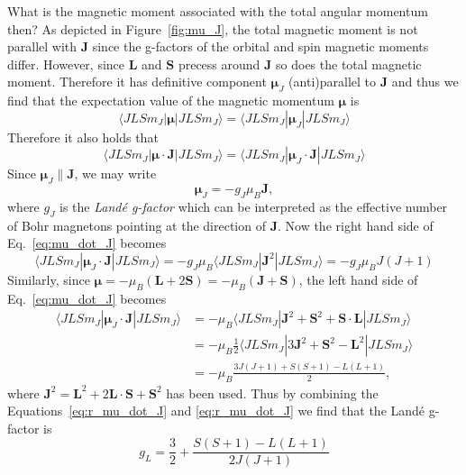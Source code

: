 What is the magnetic moment associated with the total angular momentum then?
As depicted in Figure~\ref{fig:mu_J}, the total magnetic moment is not parallel with $\mathbf{J}$ since the g-factors of the orbital and spin magnetic moments differ. However, since $\mathbf{L}$ and $\mathbf{S}$ precess around $\mathbf{J}$ so does the total magnetic moment. Therefore it has definitive component $\boldsymbol{\mu}_J$ (anti)parallel to $\mathbf{J}$ and thus we find that the expectation value of the magnetic momentum $\boldsymbol{\mu}$ is 
\begin{equation}
\langle JLSm_J|\boldsymbol{\mu}|JLSm_J\rangle
= \langle JLSm_J|\boldsymbol{\mu}_J|JLSm_J\rangle
\end{equation}
Therefore it also holds that 
\begin{equation}\label{eq:mu_dot_J}
\langle JLSm_J|\boldsymbol{\mu}\cdot\mathbf{J}|JLSm_J\rangle
= \langle JLSm_J|\boldsymbol{\mu}_J\cdot\mathbf{J}|JLSm_J\rangle
\end{equation}
Since $\boldsymbol{\mu}_J \| \mathbf{J}$, we may write
\begin{equation}
\boldsymbol{\mu}_J = - g_J \mu_B \mathbf{J},
\end{equation}
where $g_J$ is the \emph{Land\'{e} g-factor} which can be interpreted as the effective number of Bohr magnetons pointing at the direction of $\mathbf{J}$. Now the right hand side of Eq.~\eqref{eq:mu_dot_J} becomes
\begin{equation}
\langle JLSm_J|\boldsymbol{\mu}_J\cdot\mathbf{J}|JLSm_J\rangle = - g_J \mu_B \langle JLSm_J|\mathbf{J}^2 |JLSm_J\rangle = - g_J \mu_B J(J+1) \label{eq:r_mu_dot_J}
\end{equation}
Similarly, since $\boldsymbol{\mu} = - \mu_B (\mathbf{L} + 2 \mathbf{S}) = - \mu_B (\mathbf{J} + \mathbf{S})$, the left hand side of Eq.~\eqref{eq:mu_dot_J} becomes
\begin{align}
\langle JLSm_J|\boldsymbol{\mu}_J\cdot\mathbf{J}|JLSm_J\rangle &= - \mu_B \langle JLSm_J|\mathbf{J}^2+\mathbf{S}^2+\mathbf{S}\cdot\mathbf{L}|JLSm_J\rangle
\nonumber \\
&= - \mu_B \frac{1}{2} \langle JLSm_J|3 \mathbf{J}^2+ \mathbf{S}^2-  \mathbf{L}^2|JLSm_J\rangle 
\nonumber \\
&= - \mu_B \frac{3J(J+1)+S(S+1)-L(L+1)}{2}, \label{eq:l_mu_dot_J}
\end{align}
where $\mathbf{J}^2 = \mathbf{L}^2 + 2\mathbf{L} \cdot \mathbf{S} + \mathbf{S}^2$ has been used. Thus by combining the Equations~\eqref{eq:r_mu_dot_J} and \eqref{eq:r_mu_dot_J} we find that the Land\'{e} g-factor is
\begin{equation}
g_L = \frac{3}{2} + \frac{S(S+1)-L(L+1)}{2J(J+1)}
\end{equation}


 
\nocite{ashcroftmermin,blundell_book}


